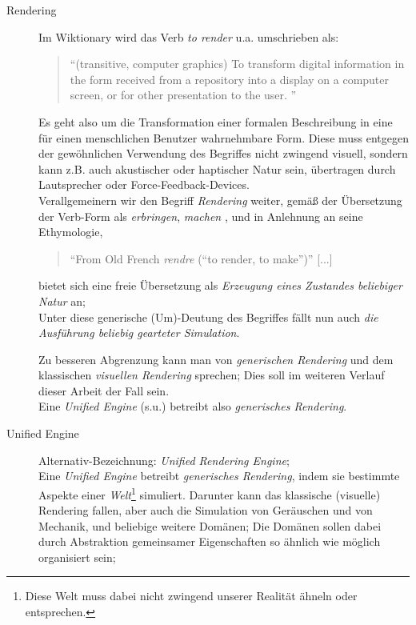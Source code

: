 \begin{description}

	\item[Rendering]
	Im Wiktionary \cite{internet:wiktionRender} wird das Verb \emph{to render} u.a. umschrieben als:
	\begin{quote}
		"`(transitive, computer graphics) To transform digital information in the form received from a repository into a 
		display on a computer screen, or for other presentation to the user. "'
	\end{quote}	
	Es geht also um die Transformation einer formalen Beschreibung in eine für einen menschlichen Benutzer wahrnehmbare 
	Form. Diese muss entgegen der gewöhnlichen Verwendung des Begriffes nicht zwingend visuell, sondern kann z.B. auch 
	akustischer oder haptischer Natur sein, übertragen durch Lautsprecher oder Force-Feedback-Devices.\\
	
	Verallgemeinern wir den Begriff \emph{Rendering} weiter, gemäß der Übersetzung der Verb-Form als 
	\emph{erbringen}, \emph{machen} \cite{internet:dictCCrender},	
	und in Anlehnung an seine Ethymologie,
	\begin{quote}
		"`From Old French \emph{rendre} (“to render, to make”)"' [...] \cite{internet:wiktionRender}
	\end{quote}
	
	bietet sich eine freie Übersetzung als \emph{Erzeugung eines Zustandes beliebiger Natur} an;\\
	Unter diese generische (Um)-Deutung des Begriffes fällt nun auch \emph{die Ausführung beliebig gearteter Simulation}.
	
	Zu besseren Abgrenzung kann man von \emph{generischen Rendering} und dem klassischen 
	\emph{visuellen Rendering} sprechen; Dies soll im weiteren Verlauf dieser Arbeit der Fall sein.\\
	Eine \emph{Unified Engine} (s.u.) betreibt also \emph{generisches Rendering}.
	
	
	\item[Unified Engine] Alternativ-Bezeichnung: \emph{Unified Rendering Engine};\\
	Eine \emph{Unified Engine} betreibt \emph{generisches Rendering}, indem sie bestimmte Aspekte einer 
	\emph{Welt}\footnote{Diese Welt muss dabei nicht zwingend unserer Realität ähneln oder entsprechen.} simuliert. 
	Darunter kann das klassische (visuelle) Rendering fallen, aber auch die Simulation von Geräuschen und von Mechanik, und 
	beliebige weitere Domänen; Die Domänen sollen dabei durch Abstraktion gemeinsamer Eigenschaften so ähnlich wie möglich
	organisiert sein;
	

\end{description}
